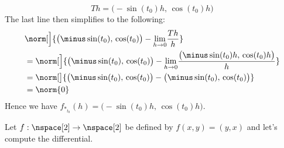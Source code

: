 \documentclass{book}                                                           %
\begin{document}
\begin{example}
\begin{equation}
                        Th=\big(\minus\sin(t_{0})h,\,\cos(t_{0})h\big)
                    \end{equation}
                    The last line then simplifies to the following:
                    \begin{subequations}
                        \begin{align}
                            \nonumber&\norm[\Big]{%
                                \big(\minus\sin(t_{0}),\,\cos(t_{0})\big)-
                                \underset{h\rightarrow{0}}{\lim}\frac{Th}{h}
                            }\\
                            &=\norm[\Big]{%
                                \big(\minus\sin(t_{0}),\,\cos(t_{0})\big)-
                                \underset{h\rightarrow{0}}{\lim}
                                \frac{%
                                    \big(\minus\sin(t_{0})h,\,\cos(t_{0})h\big)
                                }{h}
                            }\\
                            &=\norm[\big]{%
                                \big(\minus\sin(t_{0}),\,\cos(t_{0})\big)-
                                \big(\minus\sin(t_{0}),\,\cos(t_{0})\big)
                            }\\
                            &=\norm{0}
                        \end{align}
                    \end{subequations}
                    Hence we have
                    $f_{*_{t_{0}}}(h)=\big(\minus\sin(t_{0})h,\,\cos(t_{0})h\big)$.
                \end{example}
                \begin{example}
                    Let $f:\nspace[2]\rightarrow\nspace[2]$ be defined by
                    $f(x,y)=(y,x)$ and let's compute the differential.
                \end{example}
\end{document}
